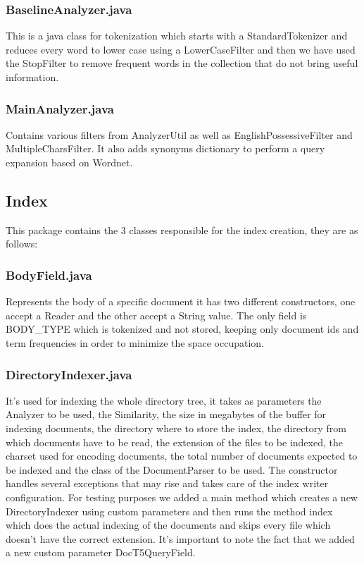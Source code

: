 \subsubsection{BaselineAnalyzer.java}
            
            This is a java class for tokenization which starts with a StandardTokenizer and reduces every word to lower case using a LowerCaseFilter and then we have used the StopFilter to remove frequent words in the collection that do not bring useful information.
\subsubsection{MainAnalyzer.java}
            
            Contains various filters from AnalyzerUtil as well as EnglishPossessiveFilter and MultipleCharsFilter. It also adds synonyms dictionary to perform a query expansion based on Wordnet.
\subsection{Index}
\label{subsec:index}
  
     This package contains the 3 classes responsible for the index creation, they are as follows: 
     
\subsubsection{BodyField.java}
    
        Represents the body of a specific document it has two different constructors, one accept a Reader and the other accept a String value. The only field is BODY\_TYPE  which is tokenized and not stored, keeping only document ids and term frequencies in order to minimize the space occupation. 
\subsubsection{DirectoryIndexer.java}
    
        It's used for indexing the whole directory tree, it takes as parameters the Analyzer to be used, the Similarity, the size in megabytes of the buffer for indexing documents, the directory where to store the index, the directory from which documents have to be read, the extension of the files to be indexed, the charset used for encoding documents, the total number of documents expected to be indexed and the class of the DocumentParser to be used. The constructor handles several exceptions that may rise and takes care of the index writer configuration. For testing purposes we added a main method which creates a new DirectoryIndexer using custom parameters and then runs the method index which does the actual indexing of the documents and skips every file which doesn't have the correct extension. It's important to note the fact that we added a new custom parameter DocT5QueryField. 
